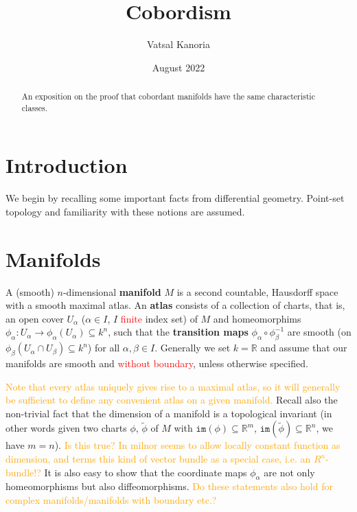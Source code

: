 \documentclass[a4paper]{article}
\theoremstyle{definition} \newtheorem*{definition}{Definition}
\theoremstyle{definition} \newtheorem*{definitions}{Definitions}
\theoremstyle{plain} \newtheorem{theorem}{Theorem}[section]
\theoremstyle{plain} \newtheorem{proposition}[theorem]{Proposition}
\theoremstyle{plain} \newtheorem{corollary}[theorem]{Corollary}
\theoremstyle{plain} \newtheorem{lemma}[theorem]{Lemma}
\theoremstyle{plain} \newtheorem{example}[theorem]{Example}
\newcommand{\checkCorrect}[1]{\textcolor{red}{#1}}
\newcommand{\understandBetter}[1]{\textcolor{orange}{#1}}
\newcommand{\question}[1]{\textcolor{orange}{#1}}
\newcommand{\defn}[1]{\textbf{#1}}
\newcommand{\realnos}{\mathbb{R}}
\begin{document}
\title{Cobordism}
\author{Vatsal Kanoria}
\date{August 2022}
\maketitle
\begin{abstract}
An exposition on the proof that cobordant manifolds have the same characteristic classes.
\end{abstract}
\tableofcontents

\section{Introduction}

We begin by recalling some important facts from differential geometry. Point-set topology and familiarity with these notions are assumed.

\section{Manifolds}

A (smooth) $n$-dimensional \defn{manifold} $M$ is a second countable, Hausdorff space with a smooth maximal atlas. An \defn{atlas} consists of a collection of charts, that is, an open cover $U_\alpha$ ($\alpha\in I$, $I$ \checkCorrect{finite} index set) of $M$ and homeomorphims $\phi_\alpha:U_\alpha \to \phi_\alpha(U_\alpha) \subseteq k^n$, such that the \defn{transition maps} $\phi_\alpha \circ \phi_\beta^{-1}$ are smooth (on $\phi_\beta(U_\alpha \cap U_\beta)\subseteq k^n$) for all $\alpha, \beta\in I$. Generally we set $k=\realnos$ and assume that our manifolds are smooth and \checkCorrect{without boundary}, unless otherwise specified. 

\understandBetter{Note that every atlas uniquely gives rise to a maximal atlas, so it will generally be sufficient to define any convenient atlas on a given manifold.} Recall also the non-trivial fact that the dimension of a manifold is a topological invariant (in other words given two charts $\phi$, $\tilde{\phi}$ of $M$ with $\mathtt{im}(\phi)\subseteq \realnos^m$, $\mathtt{im}(\tilde{\phi})\subseteq \realnos^n$, we have $m=n$). \question{Is this true? In milnor seems to allow locally constant function as dimension, and terms this kind of vector bundle as a special case, i.e. an $R^n$-bundle!?} It is also easy to show that the coordinate maps $\phi_\alpha$ are not only homeomorphisms but also diffeomorphisms. \question{Do these statements also hold for complex manifolds/manifolds with boundary etc.?}
\end{document}
